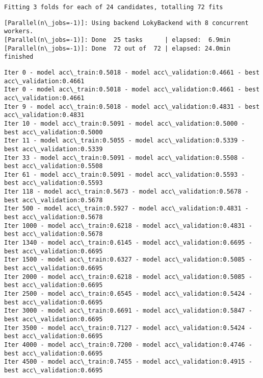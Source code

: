 \documentclass[11pt]{article}
\begin{document}
    \begin{Verbatim}[commandchars=\\\{\}]
Fitting 3 folds for each of 24 candidates, totalling 72 fits

    \end{Verbatim}

    \begin{Verbatim}[commandchars=\\\{\}]
[Parallel(n\_jobs=-1)]: Using backend LokyBackend with 8 concurrent workers.
[Parallel(n\_jobs=-1)]: Done  25 tasks      | elapsed:  6.9min
[Parallel(n\_jobs=-1)]: Done  72 out of  72 | elapsed: 24.0min finished

    \end{Verbatim}

    \begin{Verbatim}[commandchars=\\\{\}]
Iter 0 - model acc\_train:0.5018 - model acc\_validation:0.4661 - best acc\_validation:0.4661
Iter 0 - model acc\_train:0.5018 - model acc\_validation:0.4661 - best acc\_validation:0.4661
Iter 9 - model acc\_train:0.5018 - model acc\_validation:0.4831 - best acc\_validation:0.4831
Iter 10 - model acc\_train:0.5091 - model acc\_validation:0.5000 - best acc\_validation:0.5000
Iter 11 - model acc\_train:0.5055 - model acc\_validation:0.5339 - best acc\_validation:0.5339
Iter 33 - model acc\_train:0.5091 - model acc\_validation:0.5508 - best acc\_validation:0.5508
Iter 61 - model acc\_train:0.5091 - model acc\_validation:0.5593 - best acc\_validation:0.5593
Iter 118 - model acc\_train:0.5673 - model acc\_validation:0.5678 - best acc\_validation:0.5678
Iter 500 - model acc\_train:0.5927 - model acc\_validation:0.4831 - best acc\_validation:0.5678
Iter 1000 - model acc\_train:0.6218 - model acc\_validation:0.4831 - best acc\_validation:0.5678
Iter 1340 - model acc\_train:0.6145 - model acc\_validation:0.6695 - best acc\_validation:0.6695
Iter 1500 - model acc\_train:0.6327 - model acc\_validation:0.5085 - best acc\_validation:0.6695
Iter 2000 - model acc\_train:0.6218 - model acc\_validation:0.5085 - best acc\_validation:0.6695
Iter 2500 - model acc\_train:0.6545 - model acc\_validation:0.5424 - best acc\_validation:0.6695
Iter 3000 - model acc\_train:0.6691 - model acc\_validation:0.5847 - best acc\_validation:0.6695
Iter 3500 - model acc\_train:0.7127 - model acc\_validation:0.5424 - best acc\_validation:0.6695
Iter 4000 - model acc\_train:0.7200 - model acc\_validation:0.4746 - best acc\_validation:0.6695
Iter 4500 - model acc\_train:0.7455 - model acc\_validation:0.4915 - best acc\_validation:0.6695

\end{Verbatim}
\end{document}
